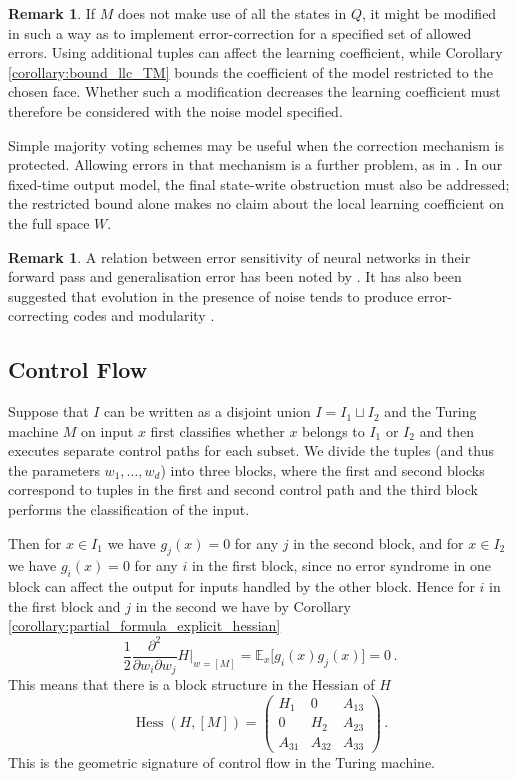\documentclass[english,letter paper,12pt,reqno]{article}
\theoremstyle{definition}
\newtheorem{remark}[theorem]{Remark}
\def\be{\begin{equation}}
\def\ee{\end{equation}}
\begin{document}
\begin{remark}
If $M$ does not make use of all the states in $Q$, it might be modified in such a way as to implement error-correction for a specified set of allowed errors. Using additional tuples can affect the learning coefficient, while Corollary \ref{corollary:bound_llc_TM} bounds the coefficient of the model restricted to the chosen face. Whether such a modification decreases the learning coefficient must therefore be considered with the noise model specified.

Simple majority voting schemes may be useful when the correction mechanism is protected. Allowing errors in that mechanism is a further problem, as in \cite{ccapuni2012turing}. In our fixed-time output model, the final state-write obstruction must also be addressed; the restricted bound alone makes no claim about the local learning coefficient on the full space $W$.
\end{remark}

\begin{remark} A relation between error sensitivity of neural networks in their forward pass and generalisation error has been noted by \cite{arora2018stronger}. It has also been suggested that evolution in the presence of noise tends to produce error-correcting codes and modularity \cite{mccourt2023noisydynamicalsystemsevolve}.
\end{remark}

\subsection{Control Flow}\label{section:control_flow}

Suppose that $I$ can be written as a disjoint union $I = I_1 \sqcup I_2$ and the Turing machine $M$ on input $x$ first classifies whether $x$ belongs to $I_1$ or $I_2$ and then executes separate control paths for each subset. We divide the tuples (and thus the parameters $w_1,\ldots,w_d$) into three blocks, where the first and second blocks correspond to tuples in the first and second control path and the third block performs the classification of the input.

Then for $x \in I_1$ we have $g_j(x) = 0$ for any $j$ in the second block, and for $x \in I_2$ we have $g_i(x) = 0$ for any $i$ in the first block, since no error syndrome in one block can affect the output for inputs handled by the other block. Hence for $i$ in the first block and $j$ in the second we have by Corollary \ref{corollary:partial_formula_explicit_hessian}
\begin{equation}
\frac{1}{2} \frac{\partial^2}{ \partial w_i \partial w_j} H \Bigr|_{w = [M]} = \mathbb{E}_x\Big[ g_i(x) g_j(x) \Big] = 0\,.
\end{equation}
This means that there is a block structure in the Hessian of $H$
\be
\operatorname{Hess}(H, [M]) = \begin{pmatrix}
H_1 & 0 & A_{13} \\
0 & H_2 & A_{23} \\
A_{31} & A_{32} & A_{33}
\end{pmatrix}\,.
\ee
This is the geometric signature of control flow in the Turing machine.
\end{document}
